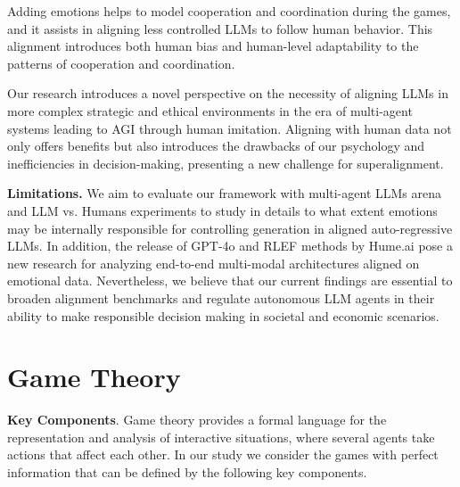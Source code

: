 \documentclass{article}
\begin{document}
Adding emotions helps to model cooperation and coordination during the games, and it assists in aligning less controlled LLMs to follow human behavior. This alignment introduces both human bias and human-level adaptability to the patterns of cooperation and coordination.

Our research introduces a novel perspective on the necessity of aligning LLMs in more complex strategic and ethical environments in the era of multi-agent systems leading to AGI through human imitation. Aligning with human data not only offers benefits but also introduces the drawbacks of our psychology and inefficiencies in decision-making, presenting a new challenge for superalignment.


\textbf{Limitations.}\label{app: limits} We aim to evaluate our framework with multi-agent LLMs arena and LLM vs. Humans experiments to study in details to what extent emotions may be internally responsible for controlling generation in aligned auto-regressive LLMs. In addition, the release of GPT-4o and RLEF methods by Hume.ai pose a new research for analyzing end-to-end multi-modal architectures aligned on emotional data. Nevertheless, we believe that our current findings are essential to broaden alignment benchmarks and regulate autonomous LLM agents in their ability to make responsible decision making in societal and economic scenarios.



  



\newpage
\appendix

\section{Game Theory}\label{A_GT}
\textbf{Key Components}. Game theory provides a formal language for the representation and analysis of interactive situations, where several agents take actions that affect each other. In our study we consider the games with perfect information that can be defined by the following key components.


\end{document}
